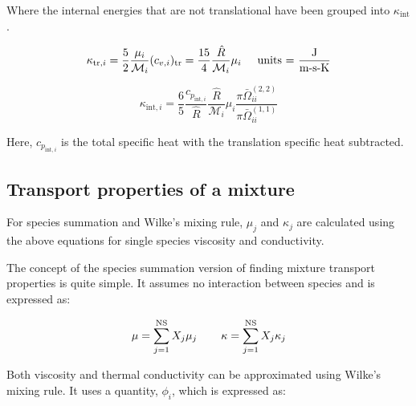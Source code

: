 \documentclass[10pt]{article}
\begin{document}
\begin{flushleft}
\begin{definition}
    Where the internal energies that are not translational have been grouped into $\kappa_\text{int}$. 

    \begin{equation}
        \kappa_{\text{tr}, i} = \frac{5}{2} \frac{\mu_i}{\mathcal{M}_i} (c_{v,i})_\text{tr} = \frac{15}{4} \frac{\hat{R}}{\mathcal{M}_i}\mu_i \hspace{5mm} \text{units = } \frac{\text{J}}{\text{m-s-K}}
    \end{equation}

    \begin{equation}
        \kappa_{\text{int}, i} = \frac{6}{5}\frac{c_{p_{\text{int},i}}}{\hat{R}} \frac{\hat{R}}{\mathcal{M}_i} \mu_i \frac{\pi \bar{\Omega}_{ii}^{(2,2)}}{\pi \bar{\Omega}_{ii}^{(1,1)}}
    \end{equation}

    Here, $c_{p_{\text{int},i}}$ is the total specific heat with the translation specific heat subtracted.

\end{definition}


\subsection{Transport properties of a mixture}

For species summation and Wilke's mixing rule, $\mu_j$ and $\kappa_j$ are calculated using the above equations for single species viscosity and conductivity.


\begin{definition}

    The concept of the species summation version of finding mixture transport properties is quite simple. It assumes no interaction between species and is expressed as:

    \begin{equation}
        \mu = \sum_{j=1}^\text{NS} X_j \mu_j \hspace{7.5mm} \kappa = \sum_{j=1}^\text{NS} X_j \kappa_j
    \end{equation}
    
\end{definition}



\begin{definition}

    Both viscosity and thermal conductivity can be approximated using Wilke's mixing rule. It uses a quantity, $\phi_i$, which is expressed as:


\end{definition}
\end{flushleft}
\end{document}
